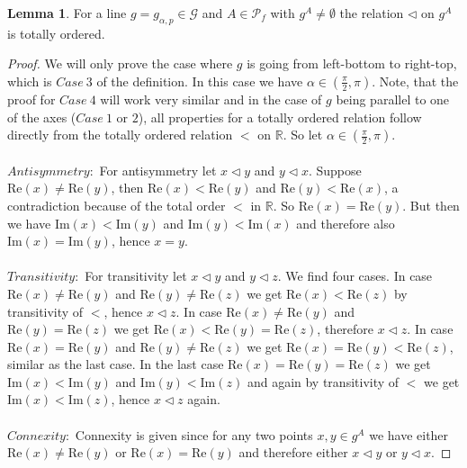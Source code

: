 \documentclass[12pt,a4paper]{scrartcl}
\newcommand{\1}{\mathbbm{1}}
\newcommand{\G}{\mathcal{G}}
\newcommand{\mP}{\mathcal{P}}
\newcommand{\re}{\text{Re}}
\newcommand{\im}{\text{Im}}
\theoremstyle{definition}
\newtheorem{lemma}{Lemma}[subsection]
\numberwithin{equation}{section}
\begin{document}
\begin{lemma}
	For a line $g=g_{\alpha,p}\in\G$ and $A\in \mP_f$ with $g^A\neq \emptyset$ the relation $\triangleleft$ on $g^A$ is totally ordered. 
\end{lemma}

\begin{proof}
	We will only prove the case where $g$ is going from left-bottom to right-top, which is $\mathit{Case}\ 3$ of the definition. In this case we have $\alpha\in (\frac{\pi}{2},\pi)$. Note, that the proof for $\mathit{Case\ }4$ will work very similar and in the case of $g$ being parallel to one of the axes ($\mathit{Case\ }1$ or $2$), all properties for a totally ordered relation follow directly from the totally ordered relation $<$ on $\mathbb{R}$. So let $\alpha\in (\frac{\pi}{2},\pi)$. \\
	\\
	$\mathit{Antisymmetry:}$ For antisymmetry let $x \triangleleft y$ and $y \triangleleft x$. Suppose $\re(x)\neq \re(y)$, then $\re(x) < \re(y)$ and $\re(y) < \re(x)$, a contradiction because of the total order $<$ in $\mathbb{R}$. So $\re(x) = \re(y)$. But then we have $\im(x) < \im(y)$ and $\im(y) < \im(x)$ and therefore also $\im(x) = \im(y)$, hence $x=y$. \\
	\\
	$\mathit{Transitivity:}$ For transitivity let $x \triangleleft y$ and $y \triangleleft z$. We find four cases. In case $\re(x) \neq \re(y)$ and $\re(y) \neq \re(z)$ we get $\re(x) < \re(z)$ by transitivity of $<$, hence $x \triangleleft z$. In case $\re(x)\neq \re(y)$ and $\re(y) = \re(z)$ we get $\re(x) < \re(y) = \re(z)$, therefore $x \triangleleft z$. In case $\re(x) = \re(y)$ and $\re(y) \neq \re(z)$ we get $\re(x) = \re(y) < \re(z)$, similar as the last case. In the last case $\re(x) = \re(y) = \re(z)$ we get $\im(x) < \im(y)$ and $\im(y) < \im(z)$ and again by transitivity of $<$ we get $\im(x) < \im(z)$, hence $x \triangleleft z$ again. \\
	\\
	$\mathit{Connexity:}$ Connexity is given since for any two points $x,y\in g^A$ we have either $\re(x) \neq \re(y)$ or $\re(x) = \re(y)$ and therefore either $x\triangleleft y$ or $y\triangleleft x$.
\end{proof}
\end{document}
